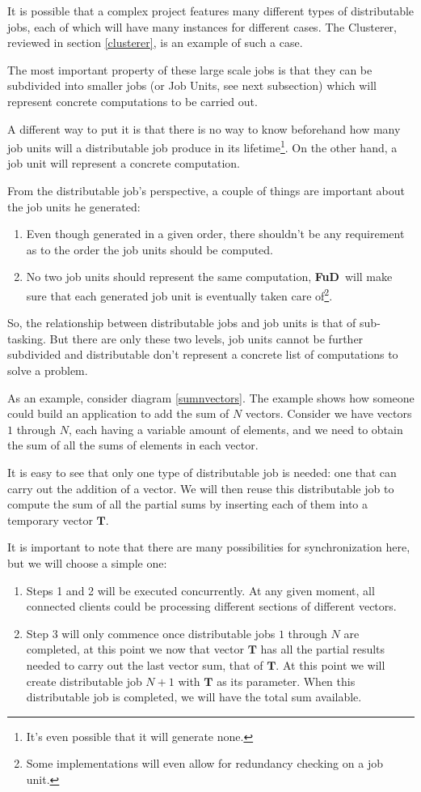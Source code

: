 \documentclass[a4paper,12pt,english]{report}
\newcommand{\fud}{\textbf{FuD}}
\begin{document}
It is possible that a complex project features many different types of distributable jobs, each of which will have many instances for different cases. The Clusterer, reviewed in section \ref{clusterer}, is an example of such a case.

The most important property of these large scale jobs is that they can be subdivided into smaller jobs (or Job Units, see next subsection) which will represent concrete computations to be carried out. 

A different way to put it is that there is no way to know beforehand how many job units will a distributable job produce in its lifetime\footnote{It's even possible that it will generate none.}. On the other hand, a job unit will represent a concrete computation.

From the distributable job's perspective, a couple of things are important about the job units he generated:
\begin{enumerate}
\item Even though generated in a given order, there shouldn't be any requirement as to the order the job units should be computed.
\item No two job units should represent the same computation, \fud \ will make sure that each generated job unit is eventually taken care of\footnote{Some implementations will even allow for redundancy checking on a job unit.}.
\end{enumerate}

So, the relationship between distributable jobs and job units is that of sub-tasking. But there are only these two levels, job units cannot be further subdivided and distributable don't represent a concrete list of computations to solve a problem.

As an example, consider diagram \ref{sumnvectors}. The example shows how someone could build an application to add the sum of $N$ vectors. Consider we have vectors $1$ through $N$, each having a variable amount of elements, and we need to obtain the sum of all the sums of elements in each vector. 

It is easy to see that only one type of distributable job is needed: one that can carry out the addition of a vector. We will then reuse this distributable job to compute the sum of all the partial sums by inserting each of them into a temporary vector $\mathbf{T}$.

It is important to note that there are many possibilities for synchronization here, but we will choose a simple one:
\begin{enumerate}
 \item Steps 1 and 2 will be executed concurrently. At any given moment, all connected clients could be processing different sections of different vectors.
 \item Step 3 will only commence once distributable jobs $1$ through $N$ are completed, at this point we now that vector $\mathbf{T}$ has all the partial results needed  to carry out the last vector sum, that of $\mathbf{T}$. At this point we will create distributable job $N+1$ with $\mathbf{T}$ as its parameter. When this distributable job is completed, we will have the total sum available.
\end{enumerate}
\end{document}
